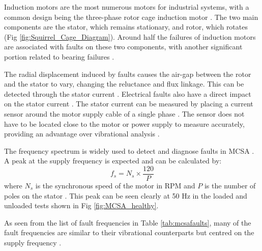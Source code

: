 Induction motors are the most numerous motors for industrial systems, with a common design being the three-phase rotor cage induction motor \cite{Squirrel_Cage_Tutorial}.
The two main components are the stator, which remains stationary, and rotor, which rotates (Fig \ref{fig:Squirrel_Cage_Diagram}).
Around half the failures of induction motors are associated with faults on these two components, with another significant portion related to bearing failures \cite{MCSA_case_studies}.
\par

The radial displacement induced by faults causes the air-gap between the rotor and the stator to vary, changing the reluctance and flux linkage.
This can be detected through the stator current \cite{CM_mcsa_vib}.
Electrical faults also have a direct impact on the stator current \cite{MCSA_Review_Benbouzid}.
The stator current can be measured by placing a current sensor around the motor supply cable of a single phase \cite{ISO20958}.
The sensor does not have to be located close to the motor or power supply to measure accurately, providing an advantage over vibrational analysis \cite{CM_mcsa_vib}.
\par

The frequency spectrum is widely used to detect and diagnose faults in MCSA \cite{MCSA_Review_Benbouzid}.
A peak at the supply frequency is expected and can be calculated by:
\begin{equation}
    f_s = N_s \times \frac{120}{P}
\end{equation}
where $N_s$ is the synchronous speed of the motor in RPM and $P$ is the number of poles on the stator \cite{Squirrel_Cage_Tutorial}.
This peak can be seen clearly at 50 Hz in the loaded and unloaded tests shown in Fig \ref{fig:MCSA_healthy}.
\par

As seen from the list of fault frequencies in Table \ref{tab:mcsafaults}, many of the fault frequencies are similar to their vibrational counterparts but centred on the supply frequency \cite{CM_mcsa_vib}.

\par

